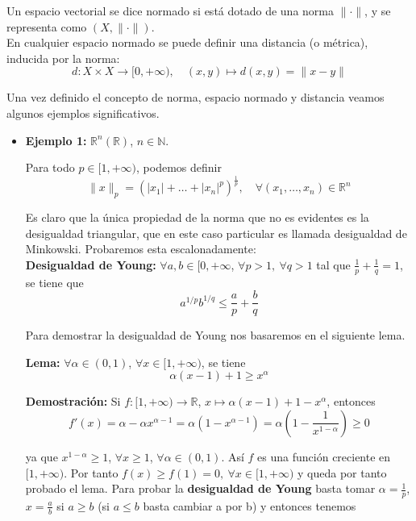 \documentclass{article}
\begin{document}
Un espacio vectorial se dice normado si está dotado de una norma $\|\cdot\|$, y se representa como $(X,\|\cdot\|)$.\\

En cualquier espacio normado se puede definir una distancia (o métrica), inducida por la norma:
\begin{equation*}
d:X\times X\rightarrow [0,+\infty),\quad (x,y)\mapsto d(x,y)=\|x-y\|
\end{equation*}

Una vez definido el concepto de norma, espacio normado y distancia veamos algunos ejemplos significativos.

\begin{itemize}
\item \textbf{Ejemplo 1:} $\mathbb{R}^n(\mathbb{R})$, $n\in \mathbb{N}$.

Para todo $p\in [1,+\infty)$, podemos definir
\begin{equation*}
\|x\|_p=(|x_1|+\ldots+|x_n|^p)^\frac{1}{p},\quad \forall (x_1,\ldots,x_n)\in \mathbb{R}^n
\end{equation*}

Es claro que la única propiedad de la norma que no es evidentes es la desigualdad triangular, que en este caso particular es llamada desigualdad de Minkowski. Probaremos esta escalonadamente:\\

\textbf{Desigualdad de Young:} $\forall a,b\in [0,+\infty$, $\forall p>1,\:\forall q>1$ tal que $\frac{1}{p}+\frac{1}{q}=1$, se tiene que
\begin{equation*}
a^{1/p}b^{1/q}\leq \frac{a}{p}+\frac{b}{q}
\end{equation*}

Para demostrar la desigualdad de Young nos basaremos en el siguiente lema.

\textbf{Lema:} $\forall \alpha\in (0,1)$, $\forall x\in [1,+\infty)$, se tiene
\begin{equation*}
\alpha(x-1)+1\geq x^\alpha
\end{equation*}

\textbf{Demostración:} Si $f:[1,+\infty)\rightarrow \mathbb{R}$, $x\mapsto \alpha(x-1)+1-x^\alpha$, entonces
\begin{equation*}
f'(x)=\alpha-\alpha x^{\alpha-1}=\alpha(1-x^{\alpha-1})=\alpha\left(1-\frac{1}{x^{1-\alpha}}\right)\geq 0
\end{equation*}

ya que $x^{1-\alpha}\geq 1$, $\forall x\geq 1$, $\forall \alpha\in (0,1)$. Así $f$ es una función creciente en $[1,+\infty)$. Por tanto $f(x)\geq f(1)=0,\:\forall x\in [1,+\infty)$ y queda por tanto probado el lema. Para probar la \textbf{desigualdad de Young} basta tomar $\alpha=\frac{1}{p}$, $x=\frac{a}{b}$ si $a\geq b$ (si $a\leq b$ basta cambiar a por b) y entonces tenemos


\end{itemize}
\end{document}
